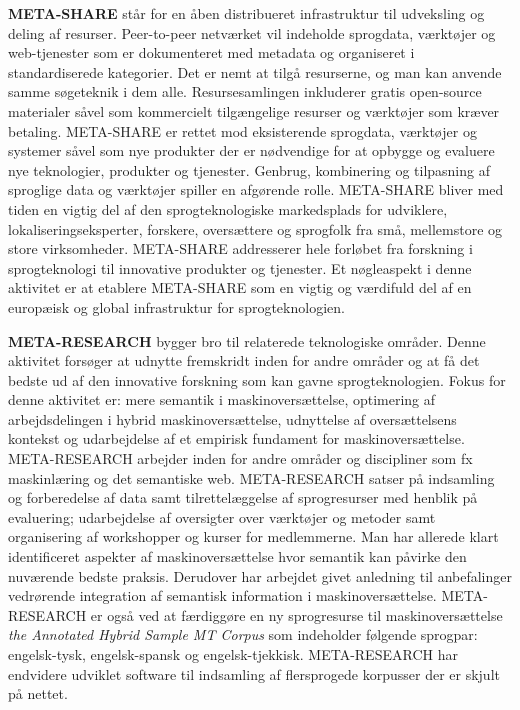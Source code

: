 \begin{multicols}{2}
\textbf{META-SHARE} st\aa r for en \aa ben distribueret infrastruktur til udveksling og deling af resurser. Peer-to-peer netv\ae rket vil indeholde sprogdata, v\ae rkt\o jer og web-tjenester som er dokumenteret med metadata og organiseret i standardiserede kategorier. Det er nemt at \mbox{tilg\aa} resurserne, og man kan anvende samme s\o geteknik i dem alle. Resursesamlingen inkluderer gratis open-source materialer s\aa vel som kommercielt tilg\ae ngelige resurser og v\ae rkt\o jer som kr\ae ver betaling. META-SHARE er rettet mod eksisterende sprogdata, v\ae rkt\o jer og systemer s\aa vel som nye produkter der er n\o dvendige for at opbygge og evaluere nye teknologier, produkter og tjenester. Genbrug, kombinering og tilpasning af sproglige data og v\ae rkt\o jer spiller en afg\o rende rolle. META-SHARE bliver med tiden en vigtig del af den sprogteknologiske markedsplads for udviklere, lokaliseringseksperter, forskere, overs\ae ttere og sprogfolk fra \mbox{sm\aa}, mellemstore og store virksomheder. META-SHARE addresserer hele forl\o bet fra forskning i sprogteknologi til innovative produkter og tjenester. Et n\o gleaspekt i denne aktivitet er at etablere META-SHARE som en vigtig og v\ae rdifuld del af en europ\ae isk og global infrastruktur for sprogteknologien. 

\textbf{META-RESEARCH} bygger bro til relaterede teknologiske omr\aa der. Denne aktivitet fors\o ger at udnytte fremskridt inden for andre omr\aa der og at \mbox{f\aa} det bedste ud af den innovative forskning som kan gavne sprogteknologien. Fokus for denne aktivitet er: mere semantik i maskinovers\ae ttelse, optimering af arbejdsdelingen i hybrid maskinovers\ae ttelse, udnyttelse af overs\ae ttelsens kontekst og udarbejdelse af et empirisk fundament for maskinovers\ae ttelse. META-RESEARCH arbejder inden for andre omr\aa der og discipliner som fx maskinl\ae ring og det semantiske web. META-RESEARCH satser \mbox{p\aa} indsamling og forberedelse af data samt tilrettel\ae ggelse af sprog\-resurser med henblik \mbox{p\aa} evaluering; udarbejdelse af oversigter over v\ae rkt\o jer og metoder samt organisering af workshopper og kurser for medlemmerne. Man har allerede klart identificeret aspekter af maskinovers\ae ttelse hvor semantik kan p\aa virke den nuv\ae rende bedste praksis. Derudover har arbejdet givet anledning til anbefalinger vedr\o rende integration af semantisk information i maskinovers\ae ttelse. META-RESEARCH er \mbox{ogs\aa} ved at f\ae rdigg\o re en ny sprogresurse til maskinovers\ae ttelse {\it the Annotated Hybrid Sample MT Corpus} som indeholder f\o lgende sprogpar: engelsk-tysk, engelsk-spansk og engelsk-tjekkisk. META-RESEARCH har endvidere udviklet software til indsamling af flersprogede korpusser der er skjult \mbox{p\aa} nettet.
\end{multicols}

